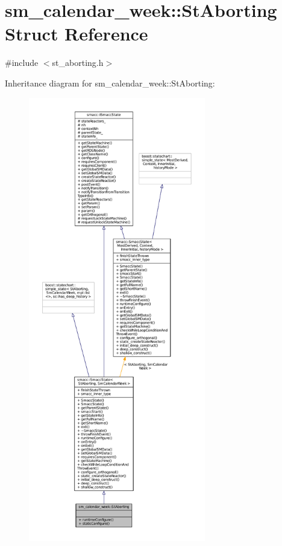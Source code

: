 \hypertarget{structsm__calendar__week_1_1StAborting}{}\section{sm\+\_\+calendar\+\_\+week\+:\+:St\+Aborting Struct Reference}
\label{structsm__calendar__week_1_1StAborting}


{\ttfamily \#include $<$st\+\_\+aborting.\+h$>$}



Inheritance diagram for sm\+\_\+calendar\+\_\+week\+:\+:St\+Aborting\+:
\nopagebreak
\begin{figure}[H]
\begin{center}
\leavevmode
\includegraphics[height=550pt]{structsm__calendar__week_1_1StAborting__inherit__graph}
\end{center}
\end{figure}


